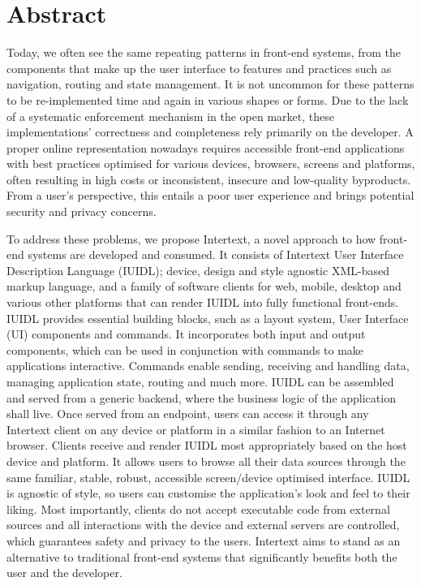 

\section*{Abstract} \label{abstract}

Today, we often see the same repeating patterns in front-end systems, from the components that make up the user interface to features and practices such as navigation, routing and state management. It is not uncommon for these patterns to be re-implemented time and again in various shapes or forms. Due to the lack of a systematic enforcement mechanism in the open market, these implementations' correctness and completeness rely primarily on the developer. A proper online representation nowadays requires accessible front-end applications with best practices optimised for various devices, browsers, screens and platforms, often resulting in high costs or inconsistent, insecure and low-quality byproducts. From a user's perspective, this entails a poor user experience and brings potential security and privacy concerns. 

To address these problems, we propose Intertext, a novel approach to how front-end systems are developed and consumed. It consists of Intertext User Interface Description Language (IUIDL); device, design and style agnostic XML-based markup language, and a family of software clients for web, mobile, desktop and various other platforms that can render IUIDL into fully functional front-ends. IUIDL provides essential building blocks, such as a layout system, User Interface (UI) components and commands. It incorporates both input and output components, which can be used in conjunction with commands to make applications interactive. Commands enable sending, receiving and handling data, managing application state, routing and much more. IUIDL can be assembled and served from a generic backend, where the business logic of the application shall live. Once served from an endpoint, users can access it through any Intertext client on any device or platform in a similar fashion to an Internet browser. Clients receive and render IUIDL most appropriately based on the host device and platform. It allows users to browse all their data sources through the same familiar, stable, robust, accessible screen/device optimised interface. IUIDL is agnostic of style, so users can customise the application's look and feel to their liking. Most importantly, clients do not accept executable code from external sources and all interactions with the device and external servers are controlled, which guarantees safety and privacy to the users. Intertext aims to stand as an alternative to traditional front-end systems that significantly benefits both the user and the developer.